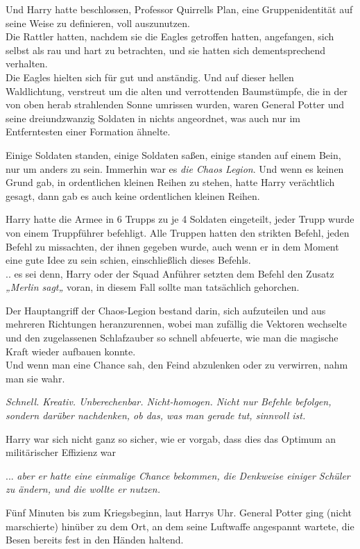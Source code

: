 {Und Harry hatte beschlossen, Professor Quirrells Plan, eine Gruppenidentität auf seine Weise zu definieren, voll auszunutzen.\\ Die Rattler hatten, nachdem sie die Eagles getroffen hatten, angefangen, sich selbst als rau und hart zu betrachten, und sie hatten sich dementsprechend verhalten.\\ Die Eagles hielten sich für gut und anständig. Und auf dieser hellen Waldlichtung, verstreut um die alten und verrottenden Baumstümpfe, die in der von oben herab strahlenden Sonne umrissen wurden, waren General Potter und seine dreiundzwanzig Soldaten in nichts angeordnet, was auch nur im Entferntesten einer Formation ähnelte.

Einige Soldaten standen, einige Soldaten saßen, einige standen auf einem Bein, nur um anders zu sein. Immerhin war es \emph{die Chaos Legion}. Und wenn es keinen Grund gab, in ordentlichen kleinen Reihen zu stehen, hatte Harry verächtlich gesagt, dann gab es auch keine ordentlichen kleinen Reihen.

Harry hatte die Armee in 6 Trupps zu je 4 Soldaten eingeteilt, jeder Trupp wurde von einem Truppführer befehligt. Alle Truppen hatten den strikten Befehl, jeden Befehl zu missachten, der ihnen gegeben wurde, auch wenn er in dem Moment eine gute Idee zu sein schien, einschließlich dieses Befehls.\\ .. es sei denn, Harry oder der Squad Anführer setzten dem Befehl den Zusatz\\ \emph{„Merlin sagt„} voran, in diesem Fall sollte man tatsächlich gehorchen.

Der Hauptangriff der Chaos-Legion bestand darin, sich aufzuteilen und aus mehreren Richtungen heranzurennen, wobei man zufällig die Vektoren wechselte und den zugelassenen Schlafzauber so schnell abfeuerte, wie man die magische Kraft wieder aufbauen konnte.\\ Und wenn man eine Chance sah, den Feind abzulenken oder zu verwirren, nahm man sie wahr.

\emph{Schnell. Kreativ. Unberechenbar. Nicht-homogen. Nicht nur Befehle befolgen, sondern darüber nachdenken, ob das, was man gerade tut, sinnvoll ist.}

Harry war sich nicht ganz so sicher, wie er vorgab, dass dies das Optimum an militärischer Effizienz war

... \emph{aber er hatte eine einmalige Chance bekommen, die Denkweise einiger Schüler zu ändern, und die wollte er nutzen.}

Fünf Minuten bis zum Kriegsbeginn, laut Harrys Uhr. General Potter ging (nicht marschierte) hinüber zu dem Ort, an dem seine Luftwaffe angespannt wartete, die Besen bereits fest in den Händen haltend.

}

